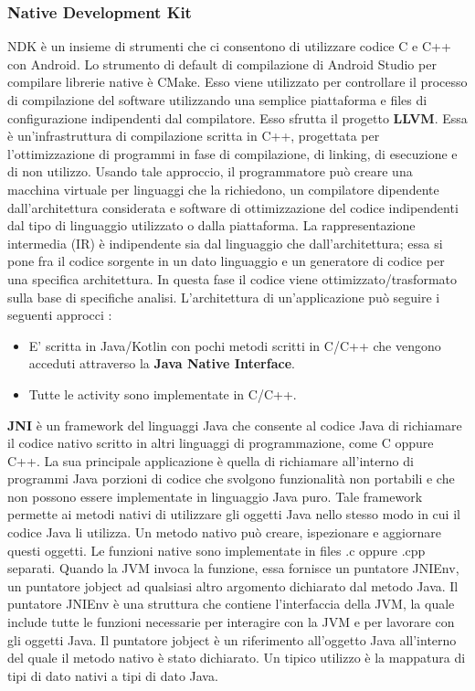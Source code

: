 \documentclass[12pt]{report}
\begin{document}
\subsubsection{Native Development Kit}
NDK è un insieme di strumenti che ci consentono di utilizzare codice C e C++ con Android. Lo strumento di default di compilazione di Android Studio per compilare librerie native è CMake. Esso viene utilizzato per controllare il processo di compilazione del software utilizzando una semplice piattaforma e files di configurazione indipendenti dal compilatore. Esso sfrutta il progetto \textbf{LLVM}. Essa è un'infrastruttura di compilazione scritta in C++, progettata per l'ottimizzazione di programmi in fase di compilazione, di linking, di esecuzione e di non utilizzo. Usando tale approccio, il programmatore può creare una macchina virtuale per linguaggi che la richiedono, un compilatore dipendente dall'architettura considerata e software di ottimizzazione del codice indipendenti dal tipo di linguaggio utilizzato o dalla piattaforma. La rappresentazione intermedia (IR) è indipendente sia dal linguaggio che dall'architettura; essa si pone fra il codice sorgente in un dato linguaggio e un generatore di codice per una specifica architettura. In questa fase il codice viene ottimizzato/trasformato sulla base di specifiche analisi. L'architettura di un'applicazione può seguire i seguenti approcci :
\begin{itemize}
\item E' scritta in Java/Kotlin con pochi metodi scritti in C/C++ che vengono acceduti attraverso la \textbf{Java Native Interface}.
\item Tutte le activity sono implementate in C/C++.
\end{itemize}
\textbf{JNI} è un framework del linguaggi Java che consente al codice Java di richiamare il codice nativo scritto in altri linguaggi di programmazione, come C oppure C++. La sua principale applicazione è quella di richiamare all'interno di programmi Java porzioni di codice che svolgono funzionalità non portabili e che non possono essere implementate in linguaggio Java puro. Tale framework permette ai metodi nativi di utilizzare gli oggetti Java nello stesso modo in cui il codice Java li utilizza. Un metodo nativo può creare, ispezionare e aggiornare questi oggetti. Le funzioni native sono implementate in files .c oppure .cpp separati. Quando la JVM invoca la funzione, essa fornisce un puntatore JNIEnv, un puntatore jobject ad qualsiasi altro argomento dichiarato dal metodo Java. Il puntatore JNIEnv è una struttura che contiene l'interfaccia della JVM, la quale include tutte le funzioni necessarie per interagire con la JVM e per lavorare con gli oggetti Java. Il puntatore jobject è un riferimento all'oggetto Java all'interno del quale il metodo nativo è stato dichiarato. Un tipico utilizzo è la mappatura di tipi di dato nativi a tipi di dato Java.
\end{document}
